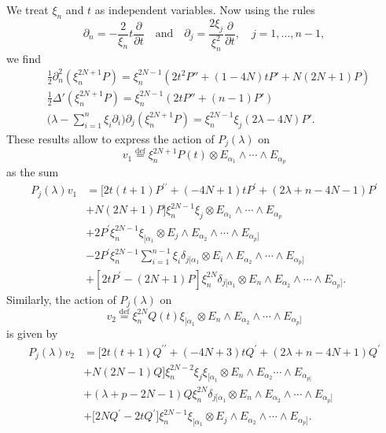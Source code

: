 \documentclass[a4paper,12pt,reqno]{amsart}
\numberwithin{theorem}{subsection}
\numberwithin{equation}{section}
\begin{document}
We treat $\xi_n$ and $t$ as independent variables. Now using the rules
\begin{equation*}
    \partial_n=-\frac{2}{\xi_n}t \frac{\partial}{\partial t} \quad
    \mbox{and} \quad
    \partial_j=\frac{2\xi_j}{\xi_n^2} \frac{\partial}{\partial t}, \quad
    j=1,\ldots,n-1,
\end{equation*}
we find
\begin{align*}
   & \frac{1}{2} \partial_n^2 (\xi_n^{2N+1} P) = \xi_n^{2N-1}(2t^2 {P}'' + (1-4N) t {P}' + N(2N+1) P) \\
   & \frac{1}{2} \Delta' (\xi_n^{2N+1} P) = \xi_n^{2N-1} (2t {P}'' + (n-1) {P}') \\
   & \big(\lambda - \sum_{i=1}^n \xi_i \partial_i\Big) \partial_j (\xi_n^{2N+1} P)
   = \xi_n^{2N-1} \xi_j (2\lambda - 4N) {P}'.
\end{align*}
These results allow to express the action of $P_j(\lambda)$ on
$$
   v_1 {\stackrel{\text{def}}{=}} \xi_n^{2N+1}P(t) \otimes E_{\alpha_1}\wedge\cdots\wedge E_{\alpha_p}
$$
as the sum
\begin{align*}
    P_j(\lambda) v_1 & = \big[
    2t(t\!+\!1) P^{\prime\prime} + (-4N\!+\!1)t P^\prime + (2\lambda\!+\!n\!-\!4N\!-\!1) P^\prime \\
    & + N(2N\!+\!1)P \big]
    \xi_n^{2N-1} \xi_j\otimes E_{\alpha_1} \wedge \cdots \wedge E_{\alpha_{p}}\\
    & + 2P^\prime\xi_n^{2N-1} \xi_{[\alpha_1}\otimes E_j \wedge E_{\alpha_2} \wedge\cdots
    \wedge E_{\alpha_{p}]} \\
    & - 2P^\prime\xi_n^{2N-1}\sum_{i=1}^{n-1}\xi_i\delta_{j[\alpha_1}
    \otimes E_i\wedge E_{\alpha_2}\wedge\cdots\wedge E_{\alpha_{p}]}\\
    & + \left[2tP^\prime - (2N\!+\!1)P\right] \xi_n^{2N}\delta_{j[\alpha_1}
    \otimes E_n\wedge E_{\alpha_2}\wedge\cdots\wedge E_{\alpha_{p}]}.
\end{align*}
Similarly, the action of $P_j(\lambda)$ on
$$
   v_2 {\stackrel{\text{def}}{=}} \xi_n^{2N}Q(t)\xi_{[\alpha_1}\otimes E_n\wedge E_{\alpha_2}\wedge\cdots\wedge E_{\alpha_p]}
$$
is given by
\begin{align*}
    P_j(\lambda)v_2 & = \big[2t(t\!+\!1) Q^{\prime\prime} + (-4N\!+\!3)tQ^\prime +
    (2\lambda\!+\!n\!-\!4N\!+\!1) Q^\prime \\
    & + N(2N\!-\!1)Q \big]\xi_n^{2N-2}\xi_j
    \xi_{[\alpha_1} \otimes E_n \wedge E_{\alpha_2} \cdots \wedge E_{\alpha_{p]}}\\
    &+ (\lambda\!+\!p\!-\!2N\!-\!1) Q \xi_n^{2N}
    \delta_{j[\alpha_1}\otimes E_n\wedge E_{\alpha_2}\wedge\cdots\wedge E_{\alpha_p]}\\
    &+ \big[2NQ^\prime - 2t Q^\prime\big]\xi_n^{2N-1}
    \xi_{[\alpha_1}\otimes E_j\wedge E_{\alpha_2}\wedge\cdots\wedge E_{\alpha_p]}.
\end{align*}
\end{document}
